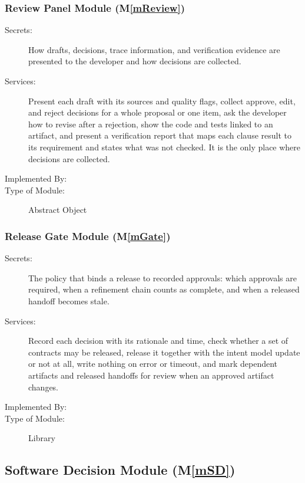 \documentclass[12pt, titlepage]{article}
\newcommand{\mref}[1]{M\ref{#1}}
\begin{document}
\subsubsection{Review Panel Module (\mref{mReview})}

\begin{description}
\item[Secrets:]How drafts, decisions, trace information, and verification
  evidence are presented to the developer and how decisions are collected.
\item[Services:]Present each draft with its sources and quality flags, collect
  approve, edit, and reject decisions for a whole proposal or one item, ask the
  developer how to revise after a rejection, show the code and tests linked to
  an artifact, and present a verification report that maps each clause result
  to its requirement and states what was not checked. It is the only place where decisions are collected.
\item[Implemented By:] \progname{}
\item[Type of Module:] Abstract Object
\end{description}

\subsubsection{Release Gate Module (\mref{mGate})}

\begin{description}
\item[Secrets:]The policy that binds a release to recorded approvals: which
  approvals are required, when a refinement chain counts as complete, and when
  a released handoff becomes stale.
\item[Services:]Record each decision with its rationale and time, check whether
  a set of contracts may be released, release it together with the intent model
  update or not at all, write nothing on error or timeout, and mark dependent
  artifacts and released handoffs for review when an approved artifact changes.
\item[Implemented By:] \progname{}
\item[Type of Module:] Library
\end{description}

\subsection{Software Decision Module (\mref{mSD})}
\end{document}
